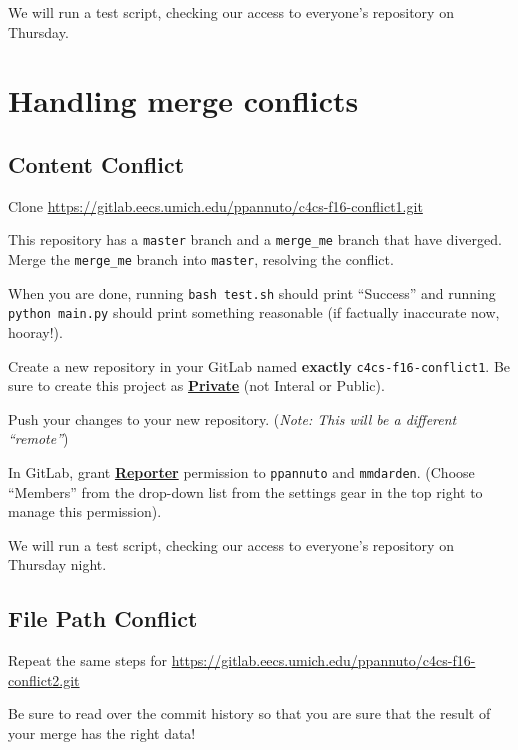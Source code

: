 \documentclass{article}
\begin{document}
We will run a test script, checking our access to everyone's repository on
Thursday.


\newpage
\section{Handling merge conflicts}

\subsection{Content Conflict}

Clone \url{https://gitlab.eecs.umich.edu/ppannuto/c4cs-f16-conflict1.git}

This repository has a \texttt{master} branch and a \texttt{merge\_me} branch
that have diverged. Merge the \texttt{merge\_me} branch into \texttt{master},
resolving the conflict.

When you are done, running \texttt{bash test.sh} should print ``Success'' and
running \texttt{python main.py} should print something reasonable (if
factually inaccurate now, hooray!).

Create a new repository in your GitLab named \textbf{exactly}
\texttt{c4cs-f16-conflict1}.
Be sure to create this project as
\textbf{\ul{Private}} (not Interal or Public).

Push your changes to your new repository. (\emph{\small Note: This will be a
  different ``remote''})

In GitLab, grant \textbf{\ul{Reporter}} permission to \texttt{ppannuto} and
\texttt{mmdarden}.
(Choose ``Members'' from the drop-down list from the settings gear in the top
right to manage this permission).

We will run a test script, checking our access to everyone's repository on
Thursday night.

\subsection{File Path Conflict}

Repeat the same steps for
\url{https://gitlab.eecs.umich.edu/ppannuto/c4cs-f16-conflict2.git}

Be sure to read over the commit history so that you are sure that the result
of your merge has the right data!
\end{document}
